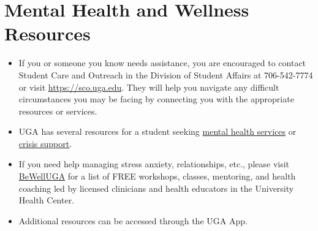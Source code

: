 \documentclass[11pt, letterpaper]{article}
\begin{document}
\section*{Mental Health and Wellness Resources}

\begin{itemize}
\item If you or someone you know needs assistance, you are encouraged to contact Student Care and Outreach in the Division of Student Affairs at 706-542-7774 or visit \href{https://sco.uga.edu}{https://sco.uga.edu}. They will help you navigate any difficult circumstances you may be facing by connecting you with the appropriate resources or services.
\item UGA has several resources for a student seeking \href{https://www.uhs.uga.edu/bewelluga/bewelluga}{mental health services} or \href{https://www.uhs.uga.edu/info/emergencies}{crisis support}.
\item If you need help managing stress anxiety, relationships, etc., please visit \href{https://www.uhs.uga.edu/bewelluga/bewelluga}{BeWellUGA} for a list of FREE workshops, classes, mentoring, and health coaching led by licensed clinicians and health educators in the University Health Center.
\item Additional resources can be accessed through the UGA App.
\end{itemize}



\end{document}
